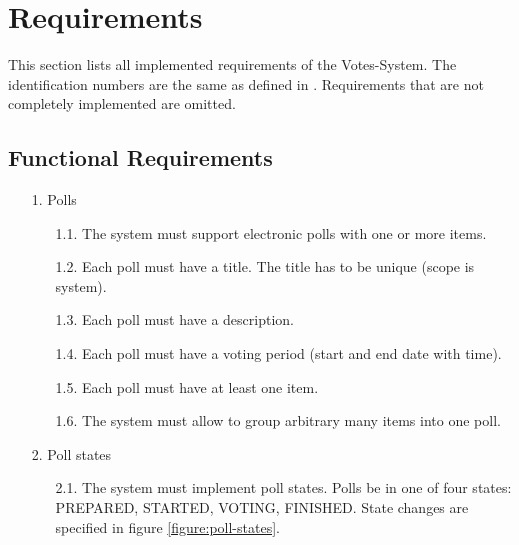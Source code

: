 \section{Requirements}
\label{sec:requirements}

This section lists all implemented requirements of the Votes-System. 
The identification numbers are the same as defined in \cite{Votes14}. 
Requirements that are not completely implemented are omitted.


\subsection{Functional Requirements}



\begin{enumerate}

\item[1.] Polls

	\begin{enumerate}
	\item
	[1.1.] The system must support electronic polls with one or more items. %
	
	
	\item
	[1.2.] Each poll must have a title. The title has to be unique (scope is system). %
	
	
	\item
	[1.3.] Each poll must have a description. %
	
	
	\item
	[1.4.] Each poll must have a voting period (start and end date with time). %
	
	
	\item
	[1.5.] Each poll must have at least one item. %
	
	
	\item
	[1.6.] The system must allow to group arbitrary many items into one poll. %
	
	\end{enumerate}




\item[2.] Poll states

	\begin{enumerate}
	\item
	[2.1.] The system must implement poll states. Polls be in one of four states: PREPARED, STARTED,
	VOTING, FINISHED. State changes are specified in figure \ref{figure:poll-states}. %
	

\end{enumerate}
\end{enumerate}
